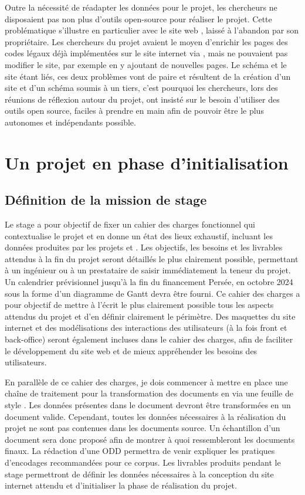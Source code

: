 Outre la nécessité de réadapter les données pour le projet, les chercheurs ne disposaient pas non plus d'outils open-source pour réaliser le projet. Cette problématique s'illustre en particulier avec le site web \LSC, laissé à l'abandon par son propriétaire. Les chercheurs du projet avaient le moyen d'enrichir les pages des codes légaux déjà implémentées sur le site internet via \FTP, mais ne pouvaient pas modifier le site, par exemple en y ajoutant de nouvelles pages. Le schéma \XML et le site \LSC étant liés, ces deux problèmes vont de paire et résultent de la création d'un site et d'un schéma soumis à un tiers, c'est pourquoi les chercheurs, lors des réunions de réflexion autour du projet, ont insisté sur le besoin d'utiliser des outils open source, faciles à prendre en main afin de pouvoir être le plus autonomes et indépendants possible. 


 \section{Un projet en phase d’initialisation}
    \subsection{Définition de la mission de stage}
Le stage a pour objectif de fixer un cahier des charges fonctionnel qui contextualise le projet et en donne un état des lieux exhaustif, incluant les données produites par les projets \LSC et \EPJ. Les objectifs, les besoins et les livrables attendus à la fin du projet seront détaillés le plus clairement possible, permettant à un ingénieur ou à un prestataire de saisir immédiatement la teneur du projet. Un calendrier prévisionnel jusqu’à la fin du financement \CollEx Persée, en octobre 2024 sous la forme d’un diagramme de Gantt devra être fourni. Ce cahier des charges a pour objectif de mettre à l’écrit le plus clairement possible tous les aspects attendus du projet et d’en définir clairement le périmètre. Des maquettes du site internet et des modélisations \UML des interactions des utilisateurs (à la fois front et back-office) seront également incluses dans le cahier des charges, afin de faciliter le développement du site web et de mieux appréhender les besoins des utilisateurs. 

En parallèle de ce cahier des charges, je dois commencer à mettre en place une chaîne de traitement pour la transformation des documents en \XML \TEI via une feuille de style \XSL. Les données présentes dans le document \XML devront être transformées en un document \TEI valide. Cependant, toutes les données nécessaires à la réalisation du projet ne sont pas contenues dans les documents \XML source. Un échantillon d’un document \TEI sera donc proposé afin de montrer à quoi ressembleront les documents finaux. La rédaction d’une ODD permettra de venir expliquer les pratiques d’encodages recommandées pour ce corpus. Les livrables produits pendant le stage permettront de définir les données nécessaires à la conception du site internet attendu et d’initialiser la phase de réalisation du projet. 


